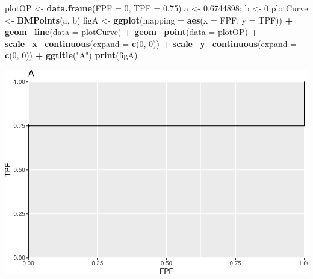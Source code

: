 \documentclass[
]{book}
\newenvironment{Shaded}{\begin{snugshade}}{\end{snugshade}}
\newcommand{\DataTypeTok}[1]{\textcolor[rgb]{0.13,0.29,0.53}{#1}}
\newcommand{\DecValTok}[1]{\textcolor[rgb]{0.00,0.00,0.81}{#1}}
\newcommand{\FloatTok}[1]{\textcolor[rgb]{0.00,0.00,0.81}{#1}}
\newcommand{\KeywordTok}[1]{\textcolor[rgb]{0.13,0.29,0.53}{\textbf{#1}}}
\newcommand{\NormalTok}[1]{#1}
\newcommand{\OperatorTok}[1]{\textcolor[rgb]{0.81,0.36,0.00}{\textbf{#1}}}
\newcommand{\StringTok}[1]{\textcolor[rgb]{0.31,0.60,0.02}{#1}}
\begin{document}
\begin{Shaded}
\begin{Highlighting}[]
\NormalTok{plotOP \textless{}{-}}\StringTok{ }\KeywordTok{data.frame}\NormalTok{(}\DataTypeTok{FPF =} \DecValTok{0}\NormalTok{, }\DataTypeTok{TPF =} \FloatTok{0.75}\NormalTok{)}
\NormalTok{a \textless{}{-}}\StringTok{ }\FloatTok{0.6744898}\NormalTok{; b \textless{}{-}}\StringTok{ }\DecValTok{0}
\NormalTok{plotCurve \textless{}{-}}\StringTok{ }\KeywordTok{BMPoints}\NormalTok{(a, b)}
\NormalTok{figA \textless{}{-}}\StringTok{ }\KeywordTok{ggplot}\NormalTok{(}\DataTypeTok{mapping =} \KeywordTok{aes}\NormalTok{(}\DataTypeTok{x =}\NormalTok{ FPF, }\DataTypeTok{y =}\NormalTok{ TPF)) }\OperatorTok{+}\StringTok{ }
\StringTok{  }\KeywordTok{geom\_line}\NormalTok{(}\DataTypeTok{data =}\NormalTok{ plotCurve) }\OperatorTok{+}\StringTok{ }
\StringTok{  }\KeywordTok{geom\_point}\NormalTok{(}\DataTypeTok{data =}\NormalTok{ plotOP)  }\OperatorTok{+}\StringTok{ }
\StringTok{  }\KeywordTok{scale\_x\_continuous}\NormalTok{(}\DataTypeTok{expand =} \KeywordTok{c}\NormalTok{(}\DecValTok{0}\NormalTok{, }\DecValTok{0}\NormalTok{)) }\OperatorTok{+}\StringTok{ }
\StringTok{  }\KeywordTok{scale\_y\_continuous}\NormalTok{(}\DataTypeTok{expand =} \KeywordTok{c}\NormalTok{(}\DecValTok{0}\NormalTok{, }\DecValTok{0}\NormalTok{)) }\OperatorTok{+}
\StringTok{  }\KeywordTok{ggtitle}\NormalTok{(}\StringTok{"A"}\NormalTok{)}
\KeywordTok{print}\NormalTok{(figA)}
\end{Highlighting}
\end{Shaded}

\begin{center}\includegraphics{22-DegenerateROCs_files/figure-latex/unnamed-chunk-2-1} \end{center}
\end{document}
